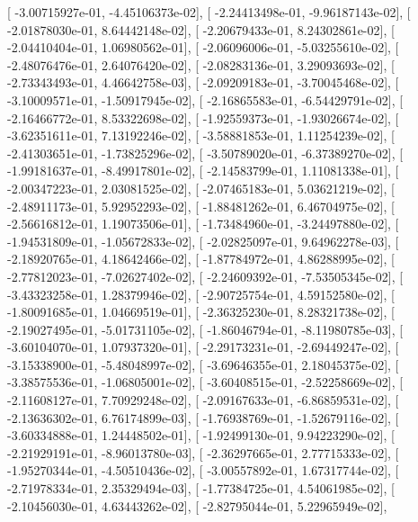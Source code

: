 \documentclass{article}
\begin{document}
       [ -3.00715927e-01,  -4.45106373e-02],
       [ -2.24413498e-01,  -9.96187143e-02],
       [ -2.01878030e-01,   8.64442148e-02],
       [ -2.20679433e-01,   8.24302861e-02],
       [ -2.04410404e-01,   1.06980562e-01],
       [ -2.06096006e-01,  -5.03255610e-02],
       [ -2.48076476e-01,   2.64076420e-02],
       [ -2.08283136e-01,   3.29093693e-02],
       [ -2.73343493e-01,   4.46642758e-03],
       [ -2.09209183e-01,  -3.70045468e-02],
       [ -3.10009571e-01,  -1.50917945e-02],
       [ -2.16865583e-01,  -6.54429791e-02],
       [ -2.16466772e-01,   8.53322698e-02],
       [ -1.92559373e-01,  -1.93026674e-02],
       [ -3.62351611e-01,   7.13192246e-02],
       [ -3.58881853e-01,   1.11254239e-02],
       [ -2.41303651e-01,  -1.73825296e-02],
       [ -3.50789020e-01,  -6.37389270e-02],
       [ -1.99181637e-01,  -8.49917801e-02],
       [ -2.14583799e-01,   1.11081338e-01],
       [ -2.00347223e-01,   2.03081525e-02],
       [ -2.07465183e-01,   5.03621219e-02],
       [ -2.48911173e-01,   5.92952293e-02],
       [ -1.88481262e-01,   6.46704975e-02],
       [ -2.56616812e-01,   1.19073506e-01],
       [ -1.73484960e-01,  -3.24497880e-02],
       [ -1.94531809e-01,  -1.05672833e-02],
       [ -2.02825097e-01,   9.64962278e-03],
       [ -2.18920765e-01,   4.18642466e-02],
       [ -1.87784972e-01,   4.86288995e-02],
       [ -2.77812023e-01,  -7.02627402e-02],
       [ -2.24609392e-01,  -7.53505345e-02],
       [ -3.43323258e-01,   1.28379946e-02],
       [ -2.90725754e-01,   4.59152580e-02],
       [ -1.80091685e-01,   1.04669519e-01],
       [ -2.36325230e-01,   8.28321738e-02],
       [ -2.19027495e-01,  -5.01731105e-02],
       [ -1.86046794e-01,  -8.11980785e-03],
       [ -3.60104070e-01,   1.07937320e-01],
       [ -2.29173231e-01,  -2.69449247e-02],
       [ -3.15338900e-01,  -5.48048997e-02],
       [ -3.69646355e-01,   2.18045375e-02],
       [ -3.38575536e-01,  -1.06805001e-02],
       [ -3.60408515e-01,  -2.52258669e-02],
       [ -2.11608127e-01,   7.70929248e-02],
       [ -2.09167633e-01,  -6.86859531e-02],
       [ -2.13636302e-01,   6.76174899e-03],
       [ -1.76938769e-01,  -1.52679116e-02],
       [ -3.60334888e-01,   1.24448502e-01],
       [ -1.92499130e-01,   9.94223290e-02],
       [ -2.21929191e-01,  -8.96013780e-03],
       [ -2.36297665e-01,   2.77715333e-02],
       [ -1.95270344e-01,  -4.50510436e-02],
       [ -3.00557892e-01,   1.67317744e-02],
       [ -2.71978334e-01,   2.35329494e-03],
       [ -1.77384725e-01,   4.54061985e-02],
       [ -2.10456030e-01,   4.63443262e-02],
       [ -2.82795044e-01,   5.22965949e-02],
\end{document}
